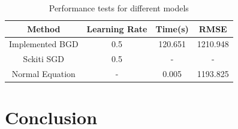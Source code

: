 \documentclass[conference]{IEEEtran}
\begin{document}
  \begin{table}[h!]
    \begin{center}
      \caption{Performance tests for different models}
      \label{table:table2}
      \begin{tabular}[10pt]{c|c|c|c}
        Method & Learning Rate & Time(s) & RMSE\\
        \hline
        Implemented BGD & 0.5 & 120.651 & 1210.948 \\
        Sckiti SGD& 0.5 & - & - \\
        Normal Equation & - & 0.005 & 1193.825 \\
    \end{tabular}
  \end{center}
\end{table}
	

\section{Conclusion}
\end{document}
